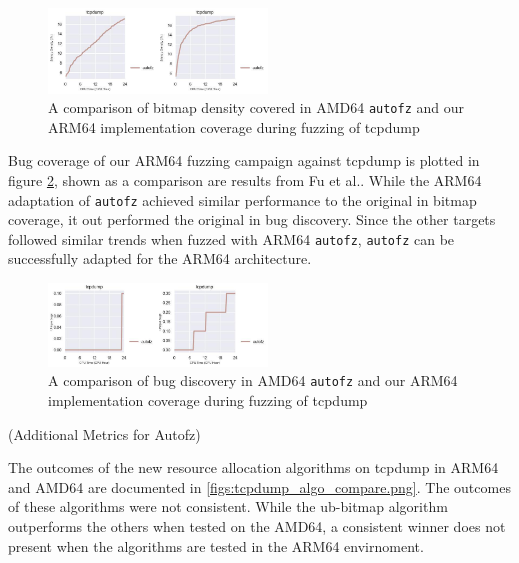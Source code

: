 \begin{figure}
    \includegraphics[width=0.52\textwidth]{figs/tcpdump_compare_orig_arm64.png}
    \centering
    \caption{A comparison of bitmap density covered in AMD64 \texttt{autofz} and our ARM64 implementation
    coverage during fuzzing of tcpdump}
    \label{fig:tcpdump_compare_orig_arm64}
\end{figure}

Bug coverage of our ARM64 fuzzing campaign against tcpdump is plotted in figure \ref{figs:tcp_compare_orig_arm64_ub.png}, 
shown as a comparison are results from Fu et al.\cite{fu_autofz_2023}. While the ARM64 adaptation of \texttt{autofz} achieved similar
performance to the original in bitmap coverage, it out performed the original in bug discovery. Since the other targets followed similar trends
when fuzzed with ARM64 \texttt{autofz}, \texttt{autofz} can be successfully adapted for the ARM64 architecture.

\begin{figure}
    \includegraphics[width=0.52\textwidth]{figs/tcpdump_compare_orig_arm64_ub.png}
    \centering
    \caption{A comparison of bug discovery in AMD64 \texttt{autofz} and our ARM64 implementation
    coverage during fuzzing of tcpdump}
    \label{figs:tcp_compare_orig_arm64_ub.png}
\end{figure}

\substection(Additional Metrics for Autofz)

The outcomes of the new resource allocation algorithms on tcpdump in ARM64 and AMD64 are documented in \ref{figs:tcpdump_algo_compare.png}. 
The outcomes of these algorithms were not consistent. While the ub-bitmap algorithm outperforms the others when tested on the AMD64, a 
consistent winner does not present when the algorithms are tested in the ARM64 envirnoment. 


